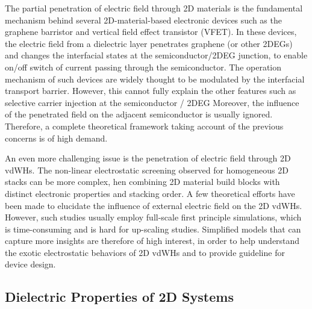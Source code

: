 The partial penetration of electric field through 2D materials is
the fundamental mechanism behind several 2D-material-based electronic
devices such as the graphene barristor and vertical field effect
transistor (VFET). 
%
In these devices, the electric field from a dielectric layer
penetrates graphene (or other 2DEGs) and changes the interfacial
states at the semiconductor/2DEG junction, to enable on/off switch of
current passing through the semiconductor.
%
The operation mechanism of such devices are widely thought to be
modulated by the interfacial transport barrier.  However, this cannot fully explain the other
features such as selective carrier injection at the semiconductor /
2DEG  
%
Moreover, the influence of the penetrated field on the adjacent
semiconductor is usually ignored.
%
Therefore, a complete theoretical framework taking account of the
previous concerns is of high demand.

An even more challenging issue is the penetration of electric field
through 2D vdWHs. The non-linear electrostatic screening observed for
homogeneous 2D stacks can be more complex, hen combining 2D material
build blocks with distinct electronic properties and stacking order.
%
A few theoretical efforts have been made to elucidate the influence of
external electric field on the 2D vdWHs. 
%
However, such studies usually employ full-scale first principle
simulations, which is time-consuming and is hard for up-scaling
studies.
%
Simplified models that can capture more insights are therefore of high
interest, in order to help understand the exotic electrostatic behaviors of 2D
vdWHs and to provide guideline for device design.


\subsection{Dielectric Properties of 2D Systems}
\label{sec:diel-prop-2d}

